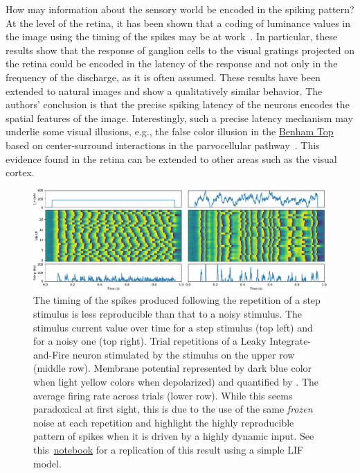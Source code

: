 \documentclass[brainsci, %
               review,submit,pdftex,moreauthors
               ]{Definitions/mdpi}
\begin{document}
How may information about the sensory world be encoded in the spiking pattern?  At the level of the retina, it has been shown that a coding of luminance values in the image using the timing of the spikes may be at work~\citep{gollisch_rapid_2008}. In particular, these results show that the response of ganglion cells to the visual gratings projected on the retina could be encoded in the latency of the response and not only in the frequency of the discharge, as it is often assumed. These results have been extended to natural images and show a qualitatively similar behavior. The authors' conclusion is that the precise spiking latency of the neurons encodes the spatial features of the image. Interestingly, such a precise latency mechanism may underlie some visual illusions, e.g., the false color illusion in the \href{https://michaelbach.de/ot/col-Benham/index.html}{Benham Top} based on center-surround interactions in the parvocellular pathway~\citep{kenyon_theory_2004}. This evidence found in the retina can be extended to other areas such as the visual cortex.
\begin{figure}
\centering
\includegraphics[width=\textwidth]{figures/replicating_MainenSejnowski1995.pdf} 
\caption{The timing of the spikes produced following the repetition of a step stimulus is less reproducible than that to a noisy stimulus. The stimulus current value over time for a step stimulus (top left) and for a noisy one (top right). Trial repetitions of a Leaky Integrate-and-Fire neuron stimulated by the stimulus on the upper row (middle row). Membrane potential represented by dark blue color when light yellow colors when depolarized) and quantified by . The average firing rate across trials (lower row). While this seems paradoxical at first sight, this is due to the use of the same \emph{frozen} noise at each repetition and highlight the highly reproducible pattern of spikes when it is driven by a highly dynamic input. See this~\href{https://github.com/laurentperrinet/2022_UE-neurosciences-computationnelles/blob/master/C_MainenSejnowski1995_Perrinet.ipynb}{notebook} for a replication of this result using a simple LIF model.}\label{fig:mainen}
\end{figure}
\end{document}
